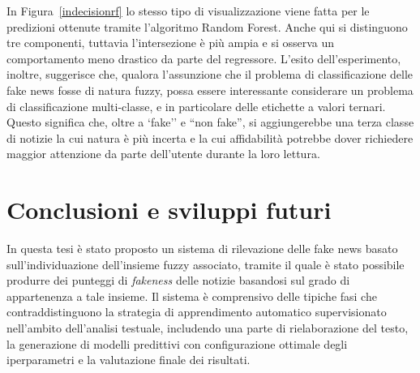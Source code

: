 \documentclass[12pt]{report}
\theoremstyle{definition}
\begin{document}
In Figura~\ref{indecisionrf} lo stesso tipo di visualizzazione viene fatta per le predizioni ottenute tramite l'algoritmo Random Forest. Anche qui si distinguono tre componenti, tuttavia l'intersezione è più ampia e si osserva un comportamento meno drastico da parte del regressore.
L'esito dell'esperimento, inoltre, suggerisce che, qualora l'assunzione che il problema di classificazione delle fake news fosse di natura fuzzy, possa essere interessante considerare un problema di classificazione multi-classe, e in particolare delle etichette a valori ternari. Questo significa che, oltre a `fake'' e ``non fake'', si aggiungerebbe una terza classe di notizie la cui natura è più incerta e la cui affidabilità potrebbe dover richiedere maggior attenzione da parte dell'utente durante la loro lettura.

\chapter*{Conclusioni e sviluppi futuri}
\onehalfspacing
In questa tesi è stato proposto un sistema di rilevazione delle fake news basato sull'individuazione dell'insieme fuzzy associato, tramite il quale è stato possibile produrre dei punteggi di \textit{fakeness} delle notizie basandosi sul grado di appartenenza a tale insieme.
Il sistema è comprensivo delle tipiche fasi che contraddistinguono la strategia di apprendimento automatico supervisionato nell'ambito dell'analisi testuale, includendo una parte di rielaborazione del testo, la generazione di modelli predittivi con configurazione ottimale degli iperparametri e la valutazione finale dei risultati.
\end{document}
